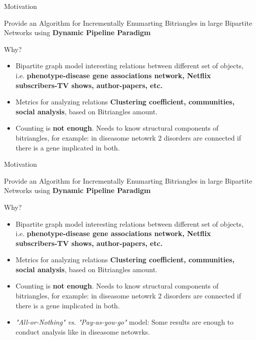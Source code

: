 \documentclass{beamer}
\begin{document}
  \begin{frame}[fragile]{Motivation}
    \begin{center}
      Provide an Algorithm for Incrementally Enumarting Bitriangles in large Bipartite Networks using \textbf{Dynamic Pipeline Paradigm}
    \end{center}    
    \begin{block}{Why?}
      \begin{itemize}
        \item {\color{light}Bipartite graph model interesting relations between different set of objects, i.e. \textbf{phenotype-disease gene associations network, Netflix subscribers-TV shows, author-papers, etc.}}
        \item {\color{light}Metrics for analyzing relations \textbf{Clustering coefficient, communities, social analysis}, based on Bitriangles amount.}
        \item Counting is \textbf{not enough}. Needs to know structural components of bitriangles, for example: in diseasome netowrk 2 disorders are connected if there is a gene implicated in both. 
      \end{itemize}
    \end{block}
  \end{frame}

  \begin{frame}[fragile]{Motivation}
    \begin{center}
      Provide an Algorithm for Incrementally Enumarting Bitriangles in large Bipartite Networks using \textbf{Dynamic Pipeline Paradigm}
    \end{center}    
    \begin{block}{Why?}
      \begin{itemize}
        \item {\color{light}Bipartite graph model interesting relations between different set of objects, i.e. \textbf{phenotype-disease gene associations network, Netflix subscribers-TV shows, author-papers, etc.}}
        \item {\color{light}Metrics for analyzing relations \textbf{Clustering coefficient, communities, social analysis}, based on Bitriangles amount.}
        \item {\color{light}Counting is \textbf{not enough}. Needs to know structural components of bitriangles, for example: in diseasome netowrk 2 disorders are connected if there is a gene implicated in both.}
        \item \emph{"All-or-Nothing" vs. "Pay-as-you-go"} model: Some results are enough to conduct analysis like in diseasome netowrks. 
      \end{itemize}
    \end{block}
  \end{frame}
\end{document}
